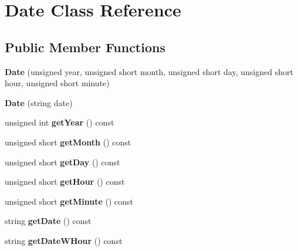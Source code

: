 \hypertarget{class_date}{}\section{Date Class Reference}
\label{class_date}
\subsection*{Public Member Functions}
\begin{DoxyCompactItemize}
\item 
\mbox{\label{class_date_a5277264fbbce7f4ebfcbcc362d6d62e7}} 
{\bfseries Date} (unsigned year, unsigned short month, unsigned short day, unsigned short hour, unsigned short minute)
\item 
\mbox{\label{class_date_a5532efafed41fd5f8e013a61313200dc}} 
{\bfseries Date} (string date)
\item 
\mbox{\label{class_date_aa1e4066bffc24af79f604dabce27e3cc}} 
unsigned int {\bfseries get\+Year} () const
\item 
\mbox{\label{class_date_ad077bd6ae19462875a8bd10aed9a6233}} 
unsigned short {\bfseries get\+Month} () const
\item 
\mbox{\label{class_date_af02c2f0b61b6e14efbc3ccb0f7f0d567}} 
unsigned short {\bfseries get\+Day} () const
\item 
\mbox{\label{class_date_a49673a3830aada7b4b55616b5848c843}} 
unsigned short {\bfseries get\+Hour} () const
\item 
\mbox{\label{class_date_aa4d5c4e15ec04ff5fa18755d76acefe0}} 
unsigned short {\bfseries get\+Minute} () const
\item 
\mbox{\label{class_date_ac33192f734973548e97e9b5d8da44a5b}} 
string {\bfseries get\+Date} () const
\item 
\mbox{\label{class_date_a1c481aea42a3a310364f9a97661bee14}} 
string {\bfseries get\+Date\+W\+Hour} () const
\item 
\mbox{\label{class_date_a262bd42a1ed4378fa115dab321096736}} 

\end{DoxyCompactItemize}
